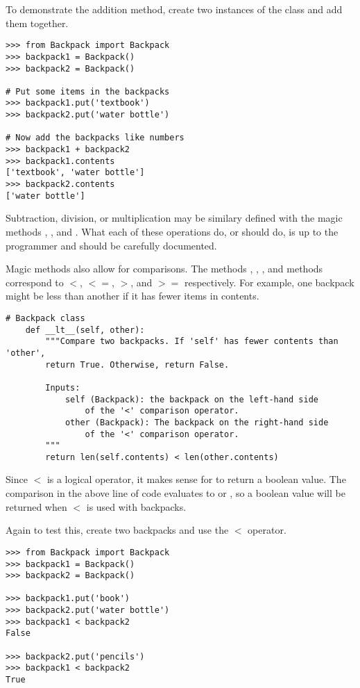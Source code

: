 To demonstrate the addition method, create two instances of the  class and add them together.

\begin{lstlisting}
>>> from Backpack import Backpack
>>> backpack1 = Backpack()
>>> backpack2 = Backpack()

# Put some items in the backpacks
>>> backpack1.put('textbook')
>>> backpack2.put('water bottle')

# Now add the backpacks like numbers
>>> backpack1 + backpack2
>>> backpack1.contents
['textbook', 'water bottle']
>>> backpack2.contents
['water bottle']
\end{lstlisting}

Subtraction, division, or multiplication may be similary defined with the magic methods , , and .
What each of these operations do, or should do, is up to the programmer and should be carefully documented.

Magic methods also allow for comparisons.
The methods , , , and  methods correspond to $<$, $<=$, $>$, and $>=$ respectively.
For example, one backpack might be less than another if it has fewer items in contents.

\begin{lstlisting}
# Backpack class
    def __lt__(self, other):
        """Compare two backpacks. If 'self' has fewer contents than 'other',
        return True. Otherwise, return False.
        
        Inputs:
            self (Backpack): the backpack on the left-hand side
                of the '<' comparison operator.
            other (Backpack): The backpack on the right-hand side
                of the '<' comparison operator.
        """
        return len(self.contents) < len(other.contents)
\end{lstlisting}

Since $<$ is a logical operator, it makes sense for  to return a boolean value.
The comparison in the above line of code evaluates to  or , so a boolean value will be returned when $<$ is used with backpacks.

Again to test this, create two backpacks and use the $<$ operator.
\begin{lstlisting}
>>> from Backpack import Backpack
>>> backpack1 = Backpack()
>>> backpack2 = Backpack()

>>> backpack1.put('book')
>>> backpack2.put('water bottle')
>>> backpack1 < backpack2
False

>>> backpack2.put('pencils')
>>> backpack1 < backpack2
True
\end{lstlisting}

